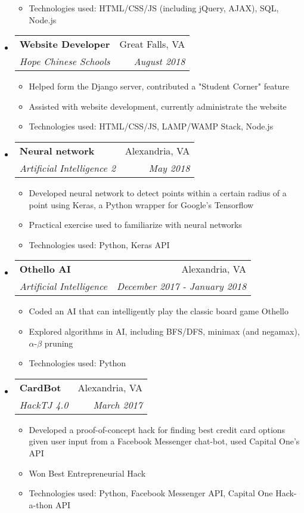 \documentclass[letterpaper,11pt]{article}
\makeatletter
\newcommand{\resitem}[1]{\item #1 \vspace{-2pt}}
\newcommand{\ressubheading}[4]{
\begin{tabular*}{7.0in}{l@{\extracolsep{\fill}}r}
		\textbf{#1} & #2 \\
		\textit{#3} & \textit{#4} \\
\end{tabular*}\vspace{-6pt}}
\makeatother
\begin{document}
\begin{itemize}
\begin{itemize}
		\resitem{Technologies used: HTML/CSS/JS (including jQuery, AJAX), SQL, Node.js}
	\end{itemize}
\item
    \ressubheading{Website Developer}{Great Falls, VA}{Hope Chinese Schools}{August 2018}
	\begin{itemize}
		\resitem{Helped form the Django server, contributed a "Student Corner" feature}
		\resitem{Assisted with website development, currently administrate the website}
		\resitem{Technologies used: HTML/CSS/JS, LAMP/WAMP Stack, Node.js}
	\end{itemize}
\item
    \ressubheading{Neural network}{Alexandria, VA}{Artificial Intelligence 2}{May 2018}
    \begin{itemize}
        \resitem{Developed neural network to detect points within a certain radius of a point using Keras, a Python wrapper for Google's Tensorflow}
        \resitem{Practical exercise used to familiarize with neural networks}
        \resitem{Technologies used: Python, Keras API}
    \end{itemize}
\item
    \ressubheading{Othello AI}{Alexandria, VA}{Artificial Intelligence}{December 2017 - January 2018}
    \begin{itemize}
        \resitem{Coded an AI that can intelligently play the classic board game Othello}
        \resitem{Explored algorithms in AI, including BFS/DFS, minimax (and negamax), $\alpha$-$\beta$ pruning}
        \resitem{Technologies used: Python}
    \end{itemize}
\item
    \ressubheading{CardBot}{Alexandria, VA}{HackTJ 4.0}{March 2017}
    \begin{itemize}
        \resitem{Developed a proof-of-concept hack for finding best credit card options given user input from a Facebook Messenger chat-bot, used Capital One's API}
        \resitem{Won Best Entrepreneurial Hack}
        \resitem{Technologies used: Python, Facebook Messenger API, Capital One Hack-a-thon API}
    \end{itemize}
\end{itemize}

\end{document}
